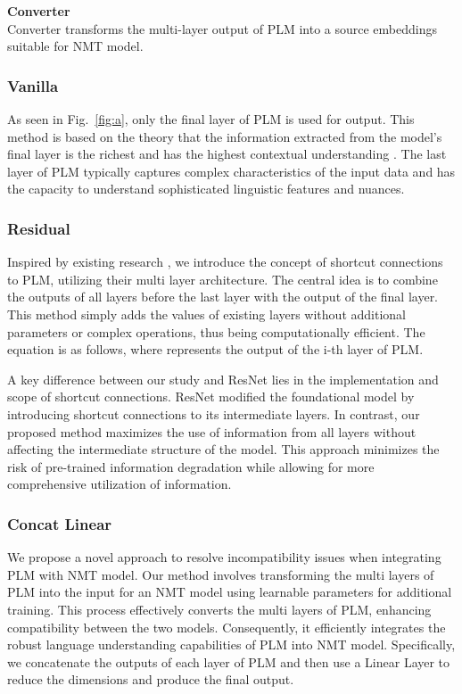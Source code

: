 \documentclass[conference]{IEEEtran}
\begin{document}
\noindent \textbf{Converter}\\
Converter transforms the multi-layer output of PLM into a source embeddings suitable for NMT model.

\subsubsection{Vanilla} 
As seen in Fig.~\ref{fig:a}, only the final layer of PLM is used for output. This method is based on the theory that the information extracted from the model's final layer is the richest and has the highest contextual understanding \cite{Sun2019}. The last layer of PLM typically captures complex characteristics of the input data and has the capacity to understand sophisticated linguistic features and nuances.


\subsubsection{Residual} 
Inspired by existing research \cite{He2015}, we introduce the concept of shortcut connections to PLM, utilizing their multi layer architecture. The central idea is to combine the outputs of all layers before the last layer with the output of the final layer. This method simply adds the values of existing layers without additional parameters or complex operations, thus being computationally efficient. The equation is as follows, where  represents the output of the i-th layer of PLM.



A key difference between our study and ResNet \cite{He2015} lies in the implementation and scope of shortcut connections. ResNet \cite{He2015} modified the foundational model by introducing shortcut connections to its intermediate layers. In contrast, our proposed method maximizes the use of information from all layers without affecting the intermediate structure of the model. This approach minimizes the risk of pre-trained information degradation while allowing for more comprehensive utilization of information.

\subsubsection{Concat Linear} 
We propose a novel approach to resolve incompatibility issues when integrating PLM with NMT model. Our method involves transforming the multi layers of PLM into the input for an NMT model using learnable parameters for additional training. This process effectively converts the multi layers of PLM, enhancing compatibility between the two models. Consequently, it efficiently integrates the robust language understanding capabilities of PLM into NMT model. Specifically, we concatenate the outputs of each layer of PLM and then use a Linear Layer to reduce the dimensions and produce the final output.
\end{document}

